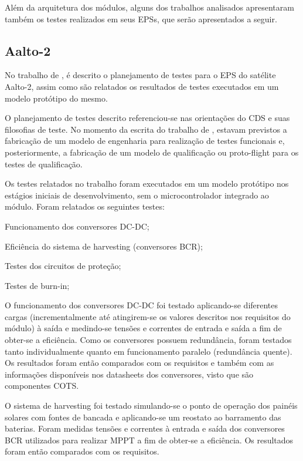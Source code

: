 Além da arquitetura dos módulos, alguns dos trabalhos analisados apresentaram também os testes realizados em seus \gls{EPS}s, que serão apresentados a seguir.

\subsection{Aalto-2}

No trabalho de \textcite{aalto-eps}, é descrito o planejamento de testes para o EPS do satélite Aalto-2, assim como são relatados os resultados de testes executados em um modelo protótipo do mesmo.

O planejamento de testes descrito referenciou-se nas orientações do \gls{CDS} e suas filosofias de teste.
No momento da escrita do trabalho de \textcite{aalto-eps}, estavam previstos a fabricação de um modelo de engenharia para realização de testes funcionais e, posteriormente, a fabricação de um modelo de qualificação ou proto-flight para os testes de qualificação.

Os testes relatados no trabalho foram executados em um modelo protótipo nos estágios iniciais de desenvolvimento, sem o microcontrolador integrado ao módulo. Foram relatados os seguintes testes:

\begin{alineas}
    \item Funcionamento dos conversores DC-DC;
    \item Eficiência do sistema de harvesting (conversores \gls{BCR});
    \item Testes dos circuitos de proteção;
    \item Testes de burn-in;
\end{alineas} 

O funcionamento dos conversores DC-DC foi testado aplicando-se diferentes cargas (incrementalmente até atingirem-se os valores descritos nos requisitos do módulo) à saída e medindo-se tensões e correntes de entrada e saída a fim de obter-se a eficiência. Como os conversores possuem redundância, foram testados tanto individualmente quanto em funcionamento paralelo (redundância quente).
Os resultados foram então comparados com os requisitos e também com as informações disponíveis nos datasheets dos conversores, visto que são componentes \gls{COTS}.

O sistema de harvesting foi testado simulando-se o ponto de operação dos painéis solares com fontes de bancada e aplicando-se um reostato ao barramento das baterias. Foram medidas tensões e correntes à entrada e saída dos conversores \gls{BCR} utilizados para realizar \gls{MPPT} a fim de obter-se a eficiência.
Os resultados foram então comparados com os requisitos.


